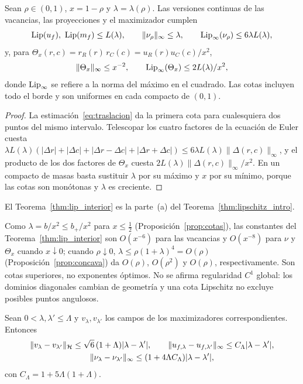 \begin{teorema}\label{thm:lip_interior}
Sean $\rho\in(0,1)$, $x=1-\rho$ y $\lambda=\lambda(\rho)$. Las versiones continuas de las vacancias,
las proyecciones y el maximizador cumplen
\[
 \Lip(u_f),\ \Lip(m_f)\le L(\lambda),\qquad \|\nu_\rho\|_\infty\le\lambda,\qquad
 \Lip_\infty(\nu_\rho)\le6\lambda L(\lambda),
\]
y, para $\Theta_x(r,c)=r_R(r)\,r_C(c)=u_R(r)u_C(c)/x^2$,
\[
 \|\Theta_x\|_\infty\le x^{-2},\qquad \operatorname{Lip}_\infty(\Theta_x)\le2L(\lambda)/x^2 ,
\]
donde $\operatorname{Lip}_\infty$ se refiere a la norma del máximo en el cuadrado. Las cotas incluyen todo el borde
y son uniformes en cada compacto de $(0,1)$.
\end{teorema}

\begin{proof}
La estimación~\eqref{eq:traslacion} da la primera cota para cualesquiera dos puntos del mismo intervalo.
Telescopar los cuatro factores de la ecuación de Euler cuesta
$\lambda L(\lambda)(|\Delta r|+|\Delta c|+|\Delta r-\Delta c|+|\Delta r+\Delta c|)\le6\lambda L(\lambda)\|\Delta(r,c)\|_\infty$,
y el producto de los dos factores de $\Theta_x$ cuesta $2L(\lambda)\|\Delta(r,c)\|_\infty/x^2$. En un
compacto de masas basta sustituir $\lambda$ por su máximo y $x$ por su mínimo, porque las cotas son
monótonas y $\lambda$ es creciente.
\end{proof}

El Teorema~\ref{thm:lip_interior} es la parte~(a) del Teorema~\ref{thm:lipschitz_intro}.

\begin{observacion}\label{obs:degeneracion}
Como $\lambda=b/x^2\le b_+/x^2$ para $x\le\frac12$ (Proposición~\ref{prop:cotas}), las constantes del
Teorema~\ref{thm:lip_interior} son $O(x^{-6})$ para las vacancias y $O(x^{-8})$ para $\nu$ y $\Theta_x$
cuando $x\downarrow0$; cuando $\rho\downarrow0$, $\lambda\le\rho(1+\lambda)^4=O(\rho)$ (Proposición~\ref{prop:concava}) da $O(\rho)$, $O(\rho^2)$ y $O(\rho)$,
respectivamente. Son cotas superiores, no exponentes óptimos. No se afirma regularidad $C^1$ global:
los dominios diagonales cambian de geometría y una cota Lipschitz no excluye posibles puntos angulosos.
\end{observacion}

\begin{proposicion}\label{prop:actividad}
Sean $0<\lambda,\lambda'\le\Lambda$ y $v_\lambda,v_{\lambda'}$ los campos de los maximizadores
correspondientes. Entonces
\begin{gather*}
 \|v_\lambda-v_{\lambda'}\|_{\mathcal{H}}\le\sqrt6\,(1+\Lambda)|\lambda-\lambda'|,\qquad
 \|u_{f,\lambda}-u_{f,\lambda'}\|_\infty\le C_\Lambda|\lambda-\lambda'|,\\
 \|\nu_\lambda-\nu_{\lambda'}\|_\infty\le(1+4\Lambda C_\Lambda)|\lambda-\lambda'|,
\end{gather*}
con $C_\Lambda=1+5\Lambda(1+\Lambda)$.
\end{proposicion}

